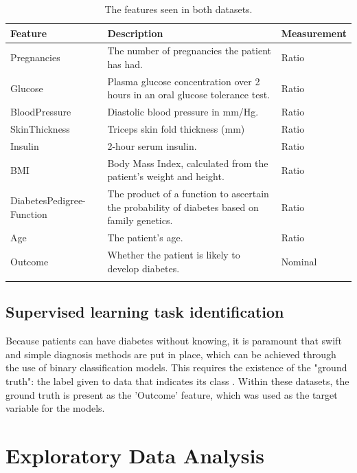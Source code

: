 \documentclass[12pt]{report}
\begin{document}
\begin{longtable}{ | p{} | p{} | p{} |}
    \hline
    \cellcolor{blue!25}Feature & \cellcolor{blue!25}Description & \cellcolor{blue!25}Measurement \\
    \hline
    Pregnancies & The number of pregnancies the patient has had. & Ratio\\
    \hline
    Glucose & Plasma glucose concentration over 2 hours in an oral glucose tolerance test. & Ratio \\
    \hline
    BloodPressure & Diastolic blood pressure in mm/Hg. & Ratio \\
    \hline
    SkinThickness & Triceps skin fold thickness (mm) & Ratio \\
    \hline
    Insulin & 2-hour serum insulin. & Ratio \\
    \hline
    BMI & Body Mass Index, calculated from the patient's weight and height. & Ratio \\
    \hline
    DiabetesPedigree-\newline Function & The product of a function to ascertain the probability of diabetes based on family genetics. \autocite{akmese_diagnosing_2022}
    & Ratio \\
    \hline
    Age & The patient's age. & Ratio\\
    \hline
    Outcome & Whether the patient is likely to develop diabetes. & Nominal\\
    \hline 
    \caption{The features seen in both datasets.}\label{tab:Features}
\end{longtable}

\pagebreak

\section{Supervised learning task identification}
Because patients can have diabetes without knowing,
it is paramount that swift and simple diagnosis methods are put in place, which can be achieved 
through the use of binary classification models. This requires the existence of the 
"ground truth": the label given to data that indicates its class \autocite{c3ai_what_nodate}. 
Within these datasets, the ground truth is present as the 'Outcome' feature, which was used 
as the target variable for the models.

\chapter{Exploratory Data Analysis}
\end{document}
